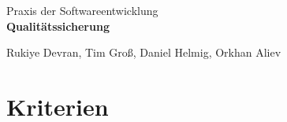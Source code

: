 \documentclass[parskip=full]{scrartcl}
\begin{document}
	\begin{titlepage}
		
		\centering
		\vspace*{0.2\textheight}
		{\Large Praxis der Softwareentwicklung}\\[\baselineskip]
		\vspace{2cm}
		{\Huge \textbf{Qualitätssicherung}}\\[\baselineskip]\par
		\vspace{2cm}
		{\LARGE Rukiye Devran, Tim Groß, Daniel Helmig, Orkhan Aliev}\par		
		\newpage	
		\tableofcontents
		\pagebreak
		
	\end{titlepage}
	\section{Kriterien}
\end{document}
